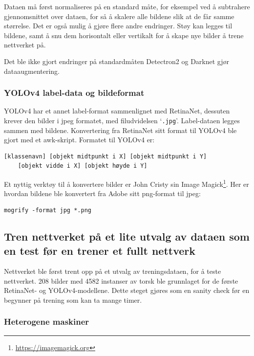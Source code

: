 Dataen må først normaliseres på en standard måte, for eksempel ved å subtrahere gjennomsnittet over dataen, for så å skalere alle bildene slik at de får samme størrelse. Det er også mulig å gjøre flere andre endringer. Støy kan legges til bildene, samt å snu dem horisontalt eller vertikalt for å skape nye bilder å trene nettverket på. \cite{Cadieu m.fl. 2014 s. 15}

Det ble ikke gjort endringer på standardmåten Detectron2 og Darknet gjør dataaugmentering.

\subsubsection{YOLOv4 label-data og bildeformat}

YOLOv4 har et annet label-format sammenlignet med RetinaNet, dessuten krever den bilder i jpeg formatet, med filudvidelsen `\texttt{.jpg}'. Label-dataen legges sammen med bildene. Konvertering fra RetinaNet sitt format til YOLOv4 ble gjort med et awk-skript. Formatet til YOLOv4 er:

\begin{verbatim}
[klassenavn] [objekt midtpunkt i X] [objekt midtpunkt i Y]
	[objekt vidde i X] [objekt høyde i Y]
\end{verbatim}

Et nyttig verktøy til å konvertere bilder er John Cristy sin Image Magick\footnote{\url{https://imagemagick.org}}. Her er hvordan bildene ble konvertert fra Adobe sitt png-format til jpeg:

\begin{verbatim}
mogrify -format jpg *.png
\end{verbatim}

\subsection{Tren nettverket på et lite utvalg av dataen som en test før en trener et fullt nettverk}

Nettverket ble først trent opp på et utvalg av treningsdataen, for å teste nettverket. 208 bilder med 4582 instanser av torsk ble grunnlaget for de første RetinaNet- og YOLOv4-modellene. Dette steget gjøres som en sanity check før en begynner på trening som kan ta mange timer.

\subsubsection{Heterogene maskiner}

